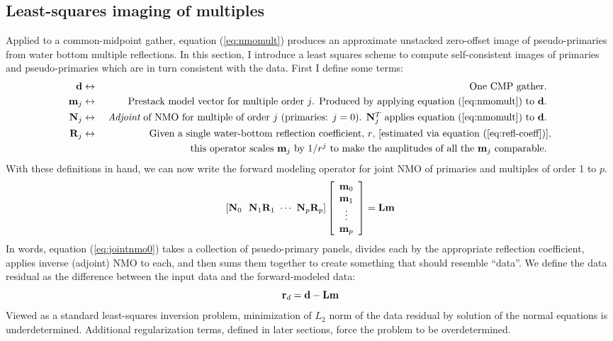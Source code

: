 \subsection{Least-squares imaging of multiples}
Applied to a common-midpoint gather, equation (\ref{eq:nmomult}) produces an approximate unstacked
zero-offset image of pseudo-primaries from water bottom multiple reflections.  
In this section, I introduce a least squares scheme to compute self-consistent images of 
primaries and pseudo-primaries which are in turn consistent with the data.  First I define 
some terms:
\begin{eqnarray*}
	\bold d   & \leftrightarrow & \mbox{ One CMP gather. } \\
	\bold m_j & \leftrightarrow & \mbox{ Prestack model vector for multiple order $j$.
		Produced by applying equation (\ref{eq:nmomult}) to $\bf d$.  } \\
	\bold N_j & \leftrightarrow & \mbox{ {\em Adjoint} of NMO for multiple of order $j$
		(primaries: $j=0$). $\bold N_j^T$ applies equation (\ref{eq:nmomult}) to $\bf d$. } \\
	\bold R_j & \leftrightarrow & \mbox{ Given a single water-bottom reflection coefficient, $r$,
		[estimated via equation (\ref{eq:refl-coeff})],} \\ 
	          &                 & \mbox{ this operator scales $\bold m_j$
		by $1/r^j$ to make the amplitudes of all the $\bold m_j$ comparable.  } \\
\end{eqnarray*}
With these definitions in hand, we can now write the forward modeling operator for joint 
NMO of primaries and multiples of order 1 to $p$.
\begin{equation}
	\left[ \bold N_0 \ \ \bold N_1 \bold R_1 \ \cdots \ \bold N_p \bold R_p \right]
	\left[
	\begin{array}{c}
		\bold m_0 \\
		\bold m_1 \\
		\vdots    \\
		\bold m_p 
	\end{array}
	\right] = \bf Lm          \label{eq:jointnmo0}
\end{equation}
In words, equation (\ref{eq:jointnmo0}) takes a collection of psuedo-primary panels, divides
each by the appropriate reflection coefficient, applies inverse (adjoint) NMO to each, and
then sums them together to create something that should resemble ``data''.
We define the data residual as the difference between the input data and the 
forward-modeled data:
\begin{equation}
	\bold r_d = \bf d - Lm       \label{eq:data-resid}
\end{equation}
Viewed as a standard least-squares inversion problem, minimization of $L_2$ norm of the 
data residual by solution of the normal equations is underdetermined.  Additional regularization
terms, defined in later sections, force the problem to be overdetermined.

